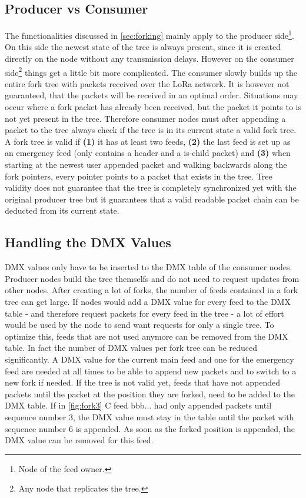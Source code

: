 \subsection{Producer vs Consumer}
The functionalities discussed in \cref{sec:forking} mainly apply to the producer side\footnote{Node of the feed owner.}. On this side the newest state of the tree is always present, since it is created directly on the node without any transmission delays. However on the consumer side\footnote{Any node that replicates the tree.} things get a little bit more complicated. The consumer slowly builds up the entire fork tree with packets received over the LoRa network. It is however not guaranteed, that the packets will be received in an optimal order. Situations may occur where a fork packet has already been received, but the packet it points to is not yet present in the tree. Therefore consumer nodes must after appending a packet to the tree always check if the tree is in its current state a valid fork tree. A fork tree is valid if \textbf{(1)} it has at least two feeds, \textbf{(2)} the last feed is set up as an emergency feed (only contains a header and a is-child packet) and \textbf{(3)} when starting at the newest user appended packet and walking backwards along the fork pointers, every pointer points to a packet that exists in the tree. Tree validity does not guarantee that the tree is completely synchronized yet with the original producer tree but it guarantees that a valid readable packet chain can be deducted from its current state.

\subsection{Handling the DMX Values}
\label{sec:dmxfork}
DMX values only have to be inserted to the DMX table of the consumer nodes. Producer nodes build the tree themselfs and do not need to request updates from other nodes.
After creating a lot of forks, the number of feeds contained in a fork tree can get large. If nodes would add a DMX value for every feed to the DMX table - and therefore request packets for every feed in the tree - a lot of effort would be used by the node to send want requests for only a single tree. To optimize this, feeds that are not used anymore can be removed from the DMX table. In fact the number of DMX values per fork tree can be reduced significantly. A DMX value for the current main feed and one for the emergency feed are needed at all times to be able to append new packets and to switch to a new fork if needed. If the tree is not valid yet, feeds that have not appended packets until the packet at the position they are forked, need to be added to the DMX table. If in \cref{fig:fork3} C feed bbb... had only appended packets until sequence number 3, the DMX value must stay in the table until the packet with sequence number 6 is appended. As soon as the forked position is appended, the DMX value can be removed for this feed.


